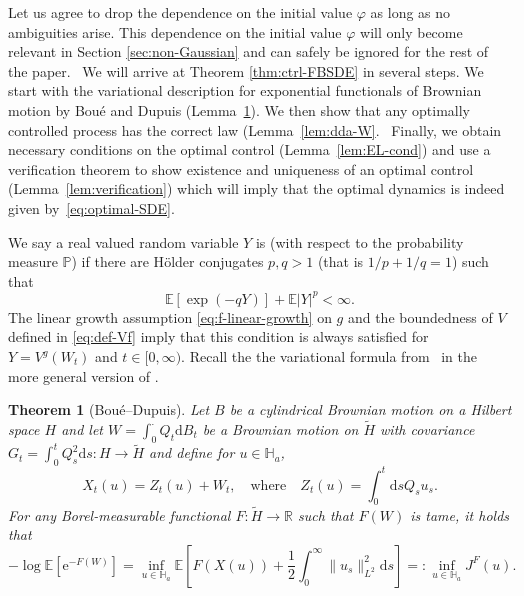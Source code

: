 \documentclass[11pt, a4paper]{scrartcl}
\numberwithin{equation}{section}
\theoremstyle{plain}
\newtheorem{theorem}[foo]{Theorem}
\theoremstyle{remark}
\newcommand{\backassign}{=:}
\newcommand{\mathd}{\mathrm{d}}
\newcommand{\mathe}{\mathrm{e}}
\newcommand{\tmtextit}[1]{\text{{\itshape{#1}}}}
\begin{document}
Let us agree to drop the dependence on the initial value $\varphi$ as long as
no ambiguities arise. This dependence on the initial value $\varphi$ will only
become relevant in Section \ref{sec:non-Gaussian} and  can safely be ignored for
the rest of the paper. \ We will arrive at Theorem \ref{thm:ctrl-FBSDE} in
several steps. We start with the variational description for exponential
functionals of Brownian motion by Bou{\'e} and Dupuis
(Lemma~\ref{lem:BD-form}). We then show that any optimally controlled process
has the correct law (Lemma~\ref{lem:dda-W}. \
Finally, we obtain necessary conditions on the optimal control
(Lemma~\ref{lem:EL-cond}) and use a verification theorem to show existence and
uniqueness of an optimal control (Lemma~\ref{lem:verification}) which will
imply that the optimal dynamics is indeed given by~\eqref{eq:optimal-SDE}.

We say a real valued random variable $Y$ is \tmtextit{tame} (with respect to
the probability measure $\mathbb{P}$) if there are H{\"o}lder conjugates $p, q
> 1$ (that is $1 / p + 1 / q = 1$) such that
\[ \mathbb{E} [\exp (- qY)] +\mathbb{E} | Y |^p < \infty . \]
The linear growth assumption \eqref{eq:f-linear-growth} on $g$ and the
boundedness of $V$ defined in \eqref{eq:def-Vf} imply that this condition is
always satisfied for $Y = V^g (W_t)$ and $t \in [0, \infty)$. Recall the the
variational formula from~{\cite{boueVariationalRepresentationCertain1998}} in
the more general version of {\cite{ustunelVariationalCalculationLaplace2014}}.

\begin{theorem}[Bou{\'e}--Dupuis]
  \label{lem:BD-form}Let $B$ be a cylindrical Brownian motion on a Hilbert
  space $H$ and let $W = \int_0^{\cdot} Q_t \mathd B_t$ be a Brownian motion
  on $\tilde{H}$ with covariance $G_t = \int_0^t Q_s^2 \mathd s : H
  \rightarrow \tilde{H}$ and define for $u \in \mathbb{H}_a$,
  \begin{equation}
    X_t (u) = Z_t (u) + W_t, \label{eq:BD-Xu} \quad \text{where} \quad Z_t
    (u) = \int_0^t \mathd s Q_s u_s .
  \end{equation}
  For any Borel-measurable functional $F : \tilde{H} \rightarrow \mathbb{R}$
  such that $F (W)$ is tame, it holds that
  \begin{equation}
    - \log \mathbb{E} [\mathe^{- F (W)}] = \inf_{u \in \mathbb{H}_a}
    \mathbb{E} \left[ F (X (u)) + \frac{1}{2} \int_0^{\infty} \| u_s
    \|^2_{L^2} \mathd s \right] \backassign \inf_{u \in \mathbb{H}_a} J^F (u)
    . \label{eq:BD-OC}
  \end{equation}
\end{theorem}
\end{document}
